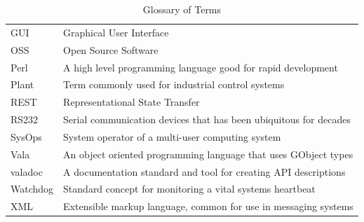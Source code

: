 \documentclass[11pt]{article}
\begin{document}
\begin{table}[H]
\begin{tabular}{l | p{10cm}}
        GUI & Graphical User Interface \\
        OSS & Open Source Software \\
        Perl & A high level programming language good for rapid development \\
        Plant & Term commonly used for industrial control systems \\
        REST & Representational State Transfer \\
        RS232 & Serial communication devices that has been ubiquitous for decades \\
        SysOps & System operator of a multi-user computing system \\
        Vala & An object oriented programming language that uses GObject types \\
        valadoc & A documentation standard and tool for creating API descriptions \\
        Watchdog & Standard concept for monitoring a vital systems heartbeat \\
        XML & Extensible markup language, common for use in messaging systems \\
        \bottomrule
      \end{tabular}
      \caption{Glossary of Terms}
      \label{tab:glossary}
    \end{table}
\end{document}
